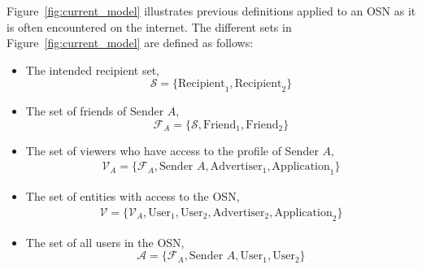 Figure~\ref{fig:current_model} illustrates previous definitions applied to an OSN as it is often encountered on the internet. The different sets in Figure~\ref{fig:current_model} are defined as follows:
\begin{itemize}
 \item The intended recipient set,
 \begin{equation*}
  \mathcal{S} = \{ \textrm{Recipient}_1, \textrm{Recipient}_2 \}
 \end{equation*}
 \item The set of friends of Sender $A$,
 \begin{equation*}
  \mathcal{F}_A = \{ \mathcal{S}, \textrm{Friend}_1, \textrm{Friend}_2 \}
 \end{equation*}
 \item The set of viewers who have access to the profile of Sender $A$,
 \begin{equation*}
  \begin{split}
   \mathcal{V}_A = \{ \mathcal{F}_A, \textrm{Sender } A, \textrm{Advertiser}_1, \textrm{Application}_1 \}
  \end{split}
 \end{equation*}
 \item The set of entities with access to the OSN,
\begin{equation*}
\begin{split}
 \mathcal{V} = \{ \mathcal{V}_A, \textrm{User}_1, \textrm{User}_2, \textrm{Advertiser}_2, \textrm{Application}_2 \}
\end{split}
\end{equation*}
\item The set of all users in the OSN,
\begin{equation*}
 \mathcal{A} = \{ \mathcal{F}_A, \textrm{Sender } A, \textrm{User}_1, \textrm{User}_2\}
\end{equation*}
\end{itemize}


